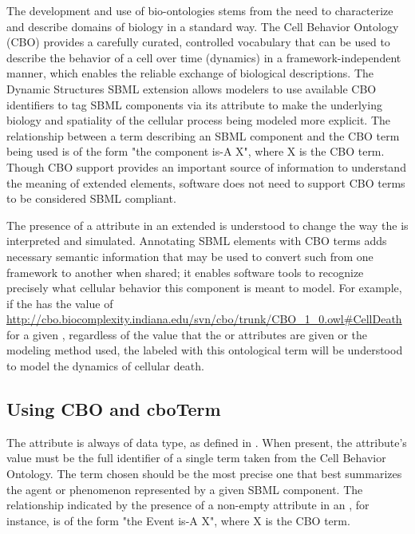 The development and use of bio-ontologies stems from the need to characterize and describe domains of biology in a standard way. The Cell Behavior Ontology (CBO) provides a carefully curated, controlled vocabulary that can be used to describe the behavior of a cell over time (dynamics) in a framework-independent manner, which enables the reliable exchange of biological descriptions. The Dynamic Structures SBML extension allows modelers to use available CBO identifiers to tag SBML components via its attribute  to make the underlying biology and spatiality of the cellular process being modeled more explicit. The relationship between a  term describing an SBML component and the CBO term being used is of the form "the component is-A X", where X is the CBO term. Though CBO support provides an important source of information to understand the meaning of extended \Event elements, software does not need to support CBO terms to be considered SBML compliant.

The presence of a  attribute in an extended \Event is understood to change the way the \Event is interpreted and simulated. Annotating SBML \Event elements with CBO terms adds necessary semantic information that may be used to convert such \Event from one framework to another when shared; it enables software tools to recognize precisely what cellular behavior this component is meant to model. For example, if the  has the value of \url{http://cbo.biocomplexity.indiana.edu/svn/cbo/trunk/CBO_1_0.owl#CellDeath} for a given \Event, regardless of the value that the  or  attributes are given or the modeling method used, the \Event labeled with this ontological term will be understood to model the dynamics of cellular death.

\subsection{Using CBO and cboTerm}
\label{subsec:CBOTerm&CBO}

The  attribute is always of  data type, as defined in . When present, the attribute's value must be the full identifier of a single term taken from the Cell Behavior Ontology. The term chosen should be the most precise one that best summarizes the agent or phenomenon represented by a given SBML component. The relationship indicated by the presence of a non-empty  attribute in an \Event, for instance, is of the form "the Event is-A X", where X is the CBO term. 

